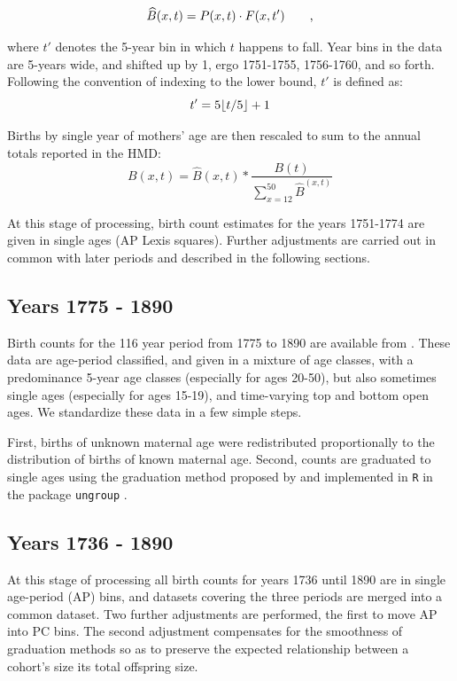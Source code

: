 		\begin{equation}
\widehat{B}(x,t) = P(x,t) \cdot F(x,t') \quad\quad\text{,}
				\end{equation}
				
				where $t'$ denotes the 5-year bin in which $t$ happens to fall. Year bins in the data are 5-years wide, and shifted up by 1, ergo 1751-1755, 1756-1760, and so forth. Following the convention of indexing to the lower bound, $t'$ is defined as:
				\begin{equation}
				t' = 5\lfloor t/5\rfloor+1
				\end{equation}

Births by single year of mothers' age are then rescaled to sum to the annual totals reported in the HMD:
		\begin{equation}
		B(x,t) = \widehat{B}(x,t) * \frac{B(t)}{\sum _{x=12}^{50}\widehat{B}^(x,t)}
		\end{equation}
		
		At this stage of processing, birth count estimates for the years 1751-1774 are given in single ages (AP Lexis squares). Further adjustments are carried out in common with later periods and described in the following sections.
		
		\subsection{Years 1775 - 1890}
		\label{sec:sgf}
		Birth counts for the 116 year period from 1775 to 1890 are available from \citet{sgf1907}. These data are age-period classified, and given in a mixture of age classes, with a
		predominance 5-year age classes (especially for ages 20-50), but also sometimes
		single ages (especially for ages 15-19), and time-varying top and bottom open
		ages. We standardize these data in a few simple steps.
		
		First, births of unknown maternal age were redistributed proportionally to the distribution of births of known maternal age. Second, counts are graduated to single ages using the graduation method proposed by \citet{rizzi2015efficient} and implemented in \texttt{R} in the package \texttt{ungroup} \citep{ungroup}. 
		
		\subsection{Years 1736 - 1890}
		\label{sec:histadj}
		At this stage of processing all birth counts for years 1736 until 1890 are in single age-period (AP) bins, and datasets covering the three periods are merged into a common dataset. Two further adjustments are performed, the first to move AP into PC bins. The second adjustment compensates for the smoothness of graduation methods so as to preserve the expected relationship between a cohort's size its total offspring size.

